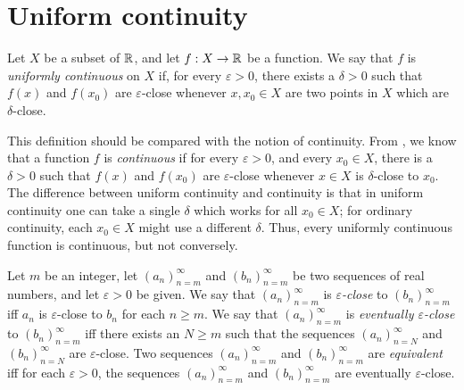 \section{Uniform continuity}\label{i:sec:9.9}

\setcounter{thm}{1}
\begin{defn}\label{i:9.9.2}
  Let \(X\) be a subset of \(\mathbb{R}\), and let \(f : X \to \mathbb{R}\) be a function.
  We say that \(f\) is \emph{uniformly continuous} on \(X\) if, for every \(\varepsilon > 0\), there exists a \(\delta > 0\) such that \(f(x)\) and \(f(x_0)\) are \(\varepsilon\)-close whenever \(x, x_0 \in X\) are two points in \(X\) which are \(\delta\)-close.
\end{defn}

\begin{rmk}\label{i:9.9.3}
  This definition should be compared with the notion of continuity.
  From , we know that a function \(f\) is \emph{continuous} if for every \(\varepsilon > 0\), and every \(x_0 \in X\), there is a \(\delta > 0\) such that \(f(x)\) and \(f(x_0)\) are \(\varepsilon\)-close whenever \(x \in X\) is \(\delta\)-close to \(x_0\).
  The difference between uniform continuity and continuity is that in uniform continuity one can take a single \(\delta\) which works for all \(x_0 \in X\);
  for ordinary continuity, each \(x_0 \in X\) might use a different \(\delta\).
  Thus, every uniformly continuous function is continuous, but not conversely.
\end{rmk}

\setcounter{thm}{4}
\begin{defn}\label{i:9.9.5}
  Let \(m\) be an integer, let \((a_n)_{n = m}^\infty\) and \((b_n)_{n = m}^\infty\) be two sequences of real numbers, and let \(\varepsilon > 0\) be given.
  We say that \((a_n)_{n = m}^\infty\) is \emph{\(\varepsilon\)-close} to \((b_n)_{n = m}^\infty\) iff \(a_n\) is \(\varepsilon\)-close to \(b_n\) for each \(n \geq m\).
  We say that \((a_n)_{n = m}^\infty\) is \emph{eventually \(\varepsilon\)-close} to \((b_n)_{n = m}^\infty\) iff there exists an \(N \geq m\) such that the sequences \((a_n)_{n = N}^\infty\) and \((b_n)_{n = N}^\infty\) are \(\varepsilon\)-close.
  Two sequences \((a_n)_{n = m}^\infty\) and \((b_n)_{n = m}^\infty\) are \emph{equivalent} iff for each \(\varepsilon > 0\), the sequences \((a_n)_{n = m}^\infty\) and \((b_n)_{n = m}^\infty\) are eventually \(\varepsilon\)-close.
\end{defn}

